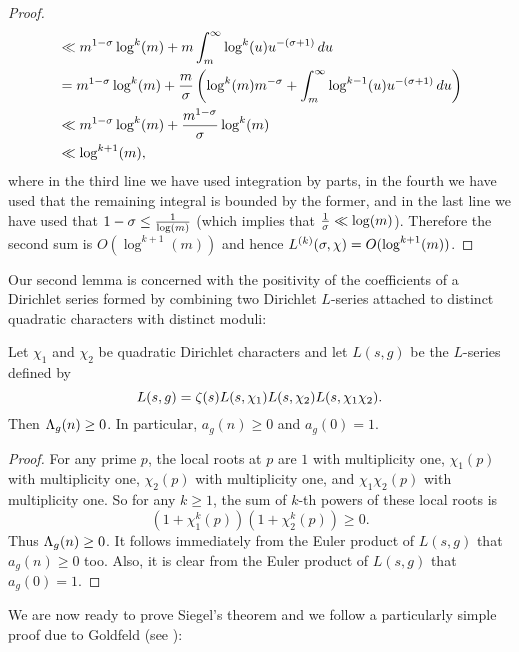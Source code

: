 \begin{proof}
\begin{align*}
        &\ll m^{1-\sigma}\log^{k}(m)+m\int_{m}^{\infty}\log^{k}(u)u^{-(\sigma+1)}\,du \\
        &= m^{1-\sigma}\log^{k}(m)+\frac{m}{\sigma}\left(\log^{k}(m)m^{-\sigma}+\int_{m}^{\infty}\log^{k-1}(u)u^{-(\sigma+1)}\,du\right) \\
        &\ll m^{1-\sigma}\log^{k}(m)+\frac{m^{1-\sigma}}{\sigma}\log^{k}(m) \\
        &\ll \log^{k+1}(m),
      \end{align*}
      where in the third line we have used integration by parts, in the fourth we have used that the remaining integral is bounded by the former, and in the last line we have used that $1-\sigma \le \frac{1}{\log(m)}$ (which implies that $\frac{1}{\sigma} \ll \log(m)$). Therefore the second sum is $O(\log^{k+1}(m))$ and hence $L^{(k)}(\sigma,\chi) = O(\log^{k+1}(m))$.
    \end{proof}

    Our second lemma is concerned with the positivity of the coefficients of a Dirichlet series formed by combining two Dirichlet $L$-series attached to distinct quadratic characters with distinct moduli:

    \begin{lemma}\label{lem:Siegel_zero_auxiliary_L-function_lemma}
      Let $\chi_{1}$ and $\chi_{2}$ be quadratic Dirichlet characters and let $L(s,g)$ be the $L$-series defined by
      \[
        L(s,g) = \zeta(s)L(s,\chi_{1})L(s,\chi_{2})L(s,\chi_{1}\chi_{2}).
      \]
      Then $\Lambda_{g}(n) \ge 0$. In particular, $a_{g}(n) \ge 0$ and $a_{g}(0) = 1$.
    \end{lemma}
    \begin{proof}
      For any prime $p$, the local roots at $p$ are $1$ with multiplicity one, $\chi_{1}(p)$ with multiplicity one, $\chi_{2}(p)$ with multiplicity one, and $\chi_{1}\chi_{2}(p)$ with multiplicity one. So for any $k \ge 1$, the sum of $k$-th powers of these local roots is
      \[
        (1+\chi_{1}^{k}(p))(1+\chi_{2}^{k}(p)) \ge 0.
      \]
      Thus $\Lambda_{g}(n) \ge 0$. It follows immediately from the Euler product of $L(s,g)$ that $a_{g}(n) \ge 0$ too. Also, it is clear from the Euler product of $L(s,g)$ that $a_{g}(0) = 1$.
    \end{proof}

    We are now ready to prove Siegel's theorem and we follow a particularly simple proof due to Goldfeld (see \cite{goldfeld1974simple}):

